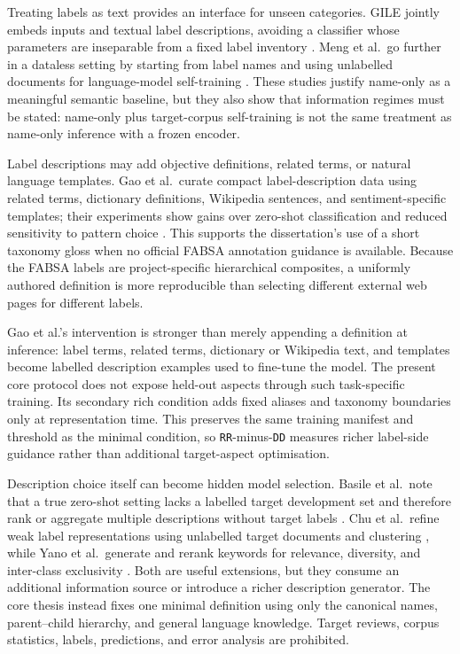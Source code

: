 Treating labels as text provides an interface for unseen categories. GILE
jointly embeds inputs and textual label descriptions, avoiding a classifier
whose parameters are inseparable from a fixed label inventory
\cite{pappas2019gile}. Meng et al.\ go further in a dataless setting by
starting from label names and using unlabelled documents for language-model
self-training \cite{meng2020labelnames}. These studies justify name-only as a
meaningful semantic baseline, but they also show that information regimes must
be stated: name-only plus target-corpus self-training is not the same treatment
as name-only inference with a frozen encoder.

Label descriptions may add objective definitions, related terms, or natural
language templates. Gao et al.\ curate compact label-description data using
related terms, dictionary definitions, Wikipedia sentences, and
sentiment-specific templates; their experiments show gains over zero-shot
classification and reduced sensitivity to pattern choice
\cite{gao2023labeldesc}. This supports the dissertation's use of a short
taxonomy gloss when no official FABSA annotation guidance is available. Because
the FABSA labels are project-specific hierarchical composites, a uniformly
authored definition is more reproducible than selecting different external web
pages for different labels.

Gao et al.'s intervention is stronger than merely appending a definition at
inference: label terms, related terms, dictionary or Wikipedia text, and
templates become labelled description examples used to fine-tune the model.
The present core protocol does not expose held-out aspects through such
task-specific training. Its secondary rich condition adds fixed aliases and
taxonomy boundaries only at representation time. This preserves the same
training manifest and threshold as the minimal condition, so
\texttt{RR}-minus-\texttt{DD} measures richer label-side guidance rather than
additional target-aspect optimisation.

Description choice itself can become hidden model selection. Basile et al.\
note that a true zero-shot setting lacks a labelled target development set and
therefore rank or aggregate multiple descriptions without target labels
\cite{basile2022ranking}. Chu et al.\ refine weak label representations using
unlabelled target documents and clustering \cite{chu2021labelrefinement}, while
Yano et al.\ generate and rerank keywords for relevance, diversity, and
inter-class exclusivity \cite{yano2024relevance}. Both are useful extensions,
but they consume an additional information source or introduce a richer
description generator. The core thesis instead fixes one minimal definition
using only the canonical names, parent--child hierarchy, and general language
knowledge. Target reviews, corpus statistics, labels, predictions, and error
analysis are prohibited.

